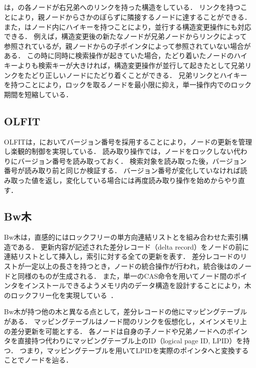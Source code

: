 \subsection{\Blinktree{}}

\Blinktree{}は，\Bptree{}の各ノードが右兄弟へのリンクを持った構造をしている．
リンクを持つことにより，親ノードからさかのぼらずに隣接するノードに達することができる．
また，\Blinktree{}はノード内にハイキーを持つことにより，並行する構造変更操作にも対応できる．
例えば，構造変更後の新たなノードが兄弟ノードからリンクによって参照されているが，親ノードからの子ポインタによって参照されていない場合がある．
この時に同時に検索操作が起きていた場合，たどり着いたノードのハイキーよりも検索キーが大きければ，構造変更操作が並行して起きたとして兄弟リンクをたどり正しいノードにたどり着くことができる．
兄弟リンクとハイキーを持つことにより，ロックを取るノードを最小限に抑え，単一操作内でのロック期間を短縮している．

\subsection{OLFIT}

OLFITは，\Blinktree{}においてバージョン番号を採用することにより，ノードの更新を管理し楽観的制御を実現している．
読み取り操作では，ノードをロックしない代わりにバージョン番号を読み取っておく．
検索対象を読み取った後，バージョン番号が読み取り前と同じか検証する．
バージョン番号が変化していなければ読み取った値を返し，変化している場合には再度読み取り操作を始めからやり直す．

\subsection{Bw木}

Bw木は，直感的にはロックフリーの単方向連結リストと\Bptree{}を組み合わせた索引構造である．
更新内容が記述された差分レコード（delta record）をノードの前に連結リストとして挿入し，索引に対する全ての更新を表す．
差分レコードのリストが一定以上の長さを持つとき，ノードの統合操作が行われ，統合後は\Bptree{}のノードと同様のものが生成される．
また，単一のCAS命令を用いてノード間のポインタをインストールできるようメモリ内のデータ構造を設計することにより，木のロックフリー化を実現している~\cite{book:DatabaseInternals}．

Bw木が持つ他の木と異なる点として，差分レコードの他にマッピングテーブルがある．
マッピングテーブルはノード間のリンクを仮想化し，メインメモリ上の差分更新を可能とする．
各ノードは自身の子ノードや兄弟ノードへのポインタを直接持つ代わりにマッピングテーブル上のID（logical page ID, LPID）を持つ．
つまり，マッピングテーブルを用いてLPIDを実際のポインタへと変換することでノードを辿る．

